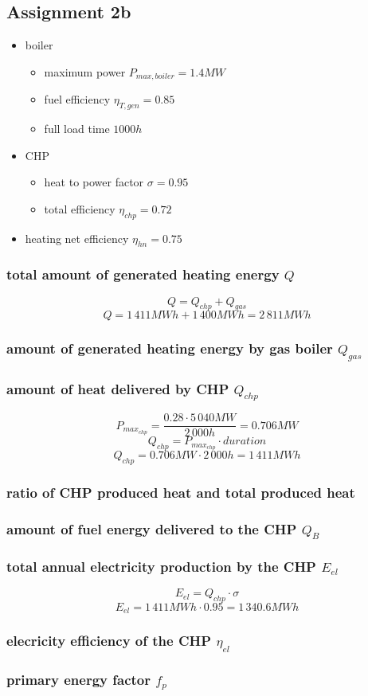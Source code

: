 \documentclass{article}
\begin{document}
	\subsection*{Assignment 2b}
		\begin{itemize}
			\item boiler
				\begin{itemize}
					\item maximum power $P_{max,boiler}=1.4MW$
					\item fuel efficiency $\eta_{T,gen}=0.85$
					\item full load time $1000h$
				\end{itemize}
			\item CHP
				\begin{itemize}
					\item heat to power factor $\sigma=0.95$
					\item total efficiency $\eta_{chp}=0.72$
				\end{itemize}
			\item heating net efficiency $\eta_{hn}=0.75$
		\end{itemize}

		\subsubsection*{total amount of generated heating energy $Q$}
			$$Q=Q_{chp}+Q_{gas}$$
			$$Q=1\,411MWh+1\,400MWh=2\,811MWh$$
		\subsubsection*{amount of generated heating energy by gas boiler $Q_{gas}$}
		\subsubsection*{amount of heat delivered by CHP $Q_{chp}$}
			$$P_{max_{chp}}=\frac{0.28\cdot 5\,040MW}{2\,000h}=0.706MW$$
			$$Q_{chp}=P_{max_{chp}}\cdot duration$$
			$$Q_{chp}=0.706MW\cdot 2\,000h = 1\,411MWh$$
		\subsubsection*{ratio of CHP produced heat and total produced heat}
		\subsubsection*{amount of fuel energy delivered to the CHP $Q_B$}
		\subsubsection*{total annual electricity production by the CHP $E_{el}$}
			$$E_{el}=Q_{chp}\cdot \sigma$$
			$$E_{el}=1\,411MWh\cdot 0.95 = 1\,340.6MWh$$
		\subsubsection*{elecricity efficiency of the CHP $\eta_{el}$}
		\subsubsection*{primary energy factor $f_p$}
\end{document}
